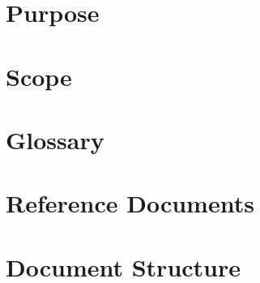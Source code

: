 \section{Purpose}
\section{Scope}
\section{Glossary}
\section{Reference Documents}
\section{Document Structure}
